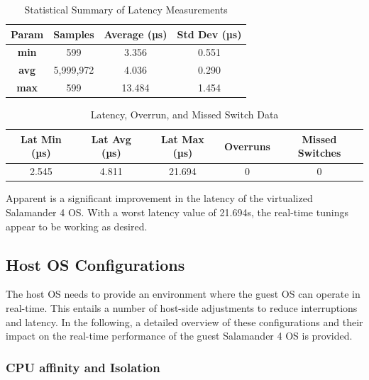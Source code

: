 \documentclass[MMR,Master,english]{twbook}
\begin{document}
\begin{table}[H]
	\centering
	\begin{tabular}{|c|c|c|c|}
	\hline
	\textbf{Param} & \textbf{Samples} & \textbf{Average (µs)} & \textbf{Std Dev (µs)} \\ \hline
	\textbf{min} & 599 & 3.356 & 0.551 \\ \hline
	\textbf{avg} & 5,999,972 & 4.036 & 0.290 \\ \hline
	\textbf{max} & 599 & 13.484 & 1.454 \\ \hline
	\end{tabular}
	\caption{Statistical Summary of Latency Measurements}
	\label{tab:latency_stats_kernelparam}
	\end{table}
	
	\begin{table}[H]
	\centering
	\begin{tabular}{|c|c|c|c|c|}
	\hline
	\textbf{Lat Min (µs)} & \textbf{Lat Avg (µs)} & \textbf{Lat Max (µs)} & \textbf{Overruns} & \textbf{Missed Switches} \\ \hline
	2.545 & 4.811 & 21.694 & 0 & 0 \\ \hline
	\end{tabular}
	\caption{Latency, Overrun, and Missed Switch Data}
	\label{tab:latency_overrun_msw_new_virt_kernel}
	\end{table}
	
\noindent Apparent is a significant improvement in the latency of the virtualized Salamander 4 OS. With a worst latency value of 21.694\textmu s, the real-time tunings appear to be working as desired. 

\clearpage
\subsection{Host OS Configurations}\label{subsec:host_configurations}
The host OS needs to provide an environment where the guest OS can operate in real-time. This entails a number of host-side adjustments to reduce interruptions and latency. In the following, a detailed overview of these configurations and their impact on the real-time performance of the guest Salamander 4 OS is provided.
\subsubsection{CPU affinity and Isolation}\label{subsubsec:cpu_isolation}
\end{document}
